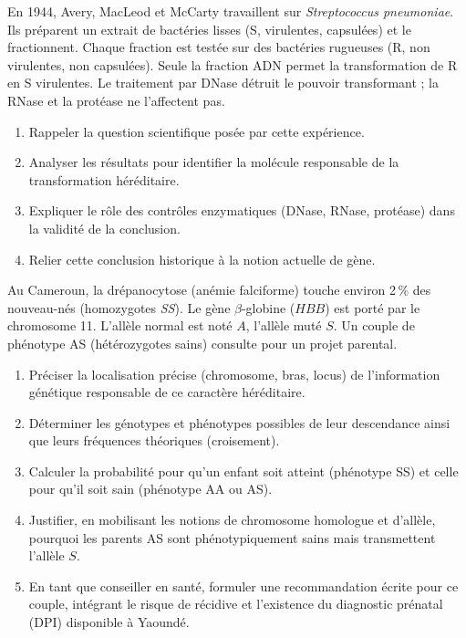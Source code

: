 \documentclass[11pt]{article}
\begin{document}
\begin{exercice}
En 1944, Avery, MacLeod et McCarty travaillent sur \textit{Streptococcus pneumoniae}. Ils préparent un extrait de bactéries lisses (S, virulentes, capsulées) et le fractionnent. Chaque fraction est testée sur des bactéries rugueuses (R, non virulentes, non capsulées). Seule la fraction ADN permet la transformation de R en S virulentes. Le traitement par DNase détruit le pouvoir transformant ; la RNase et la protéase ne l'affectent pas.

\begin{enumerate}
\item Rappeler la question scientifique posée par cette expérience.
\item Analyser les résultats pour identifier la molécule responsable de la transformation héréditaire.
\item Expliquer le rôle des contrôles enzymatiques (DNase, RNase, protéase) dans la validité de la conclusion.
\item Relier cette conclusion historique à la notion actuelle de gène.
\end{enumerate}
\end{exercice}

\begin{exercice}
Au Cameroun, la drépanocytose (anémie falciforme) touche environ 2\,\% des nouveau-nés (homozygotes \textit{SS}). Le gène $\beta$-globine ($\textit{HBB}$) est porté par le chromosome 11. L'allèle normal est noté $A$, l'allèle muté $S$. Un couple de phénotype AS (hétérozygotes sains) consulte pour un projet parental.

\begin{enumerate}
\item Préciser la localisation précise (chromosome, bras, locus) de l'information génétique responsable de ce caractère héréditaire.
\item Déterminer les génotypes et phénotypes possibles de leur descendance ainsi que leurs fréquences théoriques (croisement).
\item Calculer la probabilité pour qu'un enfant soit atteint (phénotype SS) et celle pour qu'il soit sain (phénotype AA ou AS).
\item Justifier, en mobilisant les notions de chromosome homologue et d'allèle, pourquoi les parents AS sont phénotypiquement sains mais transmettent l'allèle $S$.
\item En tant que conseiller en santé, formuler une recommandation écrite pour ce couple, intégrant le risque de récidive et l'existence du diagnostic prénatal (DPI) disponible à Yaoundé.
\end{enumerate}
\end{exercice}
\end{document}
